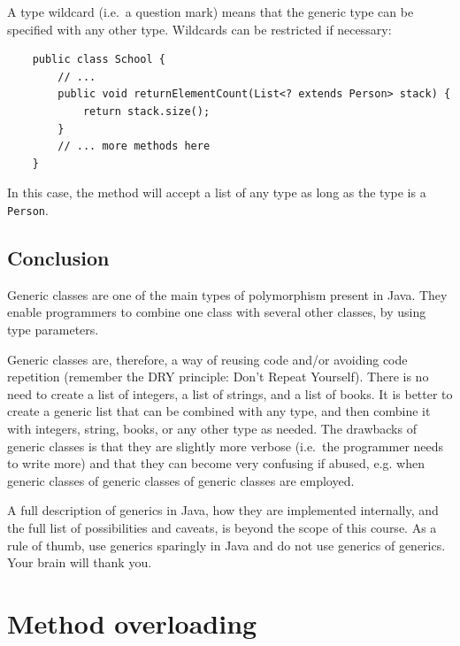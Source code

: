 A type wildcard (i.e.~a question mark) means that the generic
type can be specified with any other type. Wildcards can be restricted
if necessary: 

\begin{verbatim}
    public class School {
        // ...
        public void returnElementCount(List<? extends Person> stack) {
            return stack.size();
        }
        // ... more methods here
    }
\end{verbatim}

In this case, the method will accept a list of any type as long as the
type is a \verb+Person+. 

%
% 
% 


\subsection{Conclusion}
\label{sec:conclusion-2}

Generic classes are one of the main types of polymorphism present in
Java. They enable programmers to combine one class with several other
classes, by using type parameters. 

Generic classes are, therefore, a way of reusing code and/or avoiding
code repetition (remember the DRY principle: Don't Repeat Yourself). 
There is no need to create a list of integers, a list of
strings, and a list of books. It is better to create a generic list
that can be combined with any type, and then combine it with integers,
string, books, or any other type as needed. The drawbacks of generic
classes is that they are slightly more verbose (i.e.~the programmer
needs to write more) and that they can become very confusing if
abused, e.g. when generic classes of generic classes of generic
classes are employed. 

A full description of generics in Java, how they are implemented
internally, and the full list of possibilities and caveats, is beyond
the scope of this course. As a rule of thumb, use generics sparingly in
Java and do not use generics of generics. Your brain will thank you. 


\section{Method overloading}
\label{sec:method-overloading}

